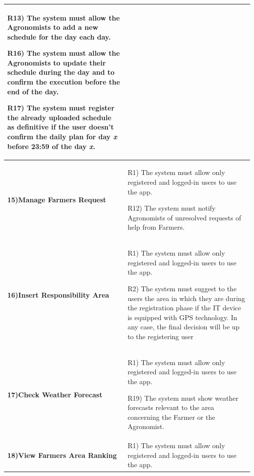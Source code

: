 \documentclass[table, 12pt]{article}
\begin{document}
\begin{itemize}
\begin{longtable}{|p{}|p{}|}
                                                                                         R13) The system must allow the Agronomists to add a new schedule for the day each day.
                                                                                        
                                                                                         R16) The system must allow the Agronomists to update their schedule during the day and to confirm the execution before the end of the day.

                                                                                         R17) The system must register the already uploaded schedule as definitive if the user doesn't confirm the daily plan for day \textit{x} before 23:59 of the day \textit{x}.\\\hline
                    
                    \cellcolor{SpringGreen!50}\textbf{15)Manage Farmers Request}\centering &  R1) The system must allow only registered and logged-in users to use the app.
                    
                                                                                    R12) The system must notify Agronomists of unresolved requests of help from Farmers.\\\hline
                    \cellcolor{SpringGreen!50}\textbf{16)Insert Responsibility Area}\centering &  R1) The system must allow only registered and logged-in users to use the app.
                    
                                                                                        R2) The system must suggest to the users the area in which they are during the registration phase if the IT device is equipped with GPS technology. In any case, the final decision will be up to the registering user\\\hline
                    \cellcolor{SpringGreen!50}\textbf{17)Check Weather Forecast}\centering & R1) The system must allow only registered and logged-in users to use the app.
                    
                                                                                     R19) The system must show weather forecasts relevant to the area concerning the Farmer or the Agronomist.\\\hline
                    \cellcolor{SpringGreen!50}\textbf{18)View Farmers Area Ranking}\centering&  R1) The system must allow only registered and logged-in users to use the app.


\end{longtable}
\end{itemize}
\end{document}
